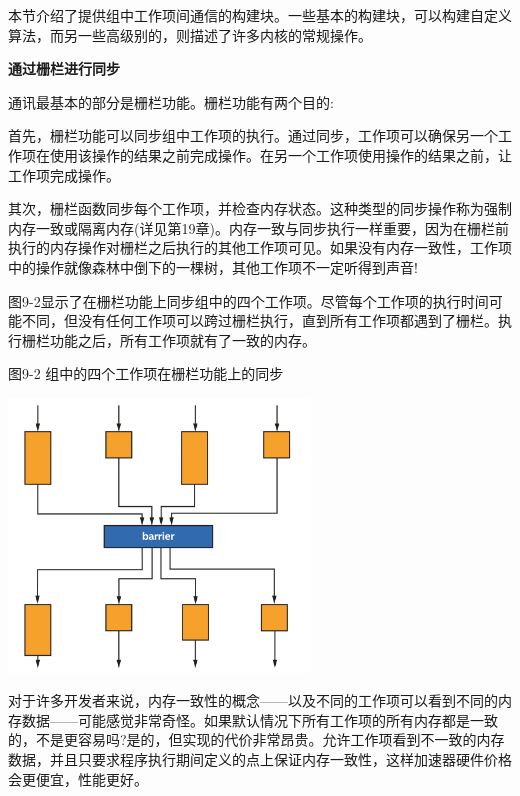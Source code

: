本节介绍了提供组中工作项间通信的构建块。一些基本的构建块，可以构建自定义算法，而另一些高级别的，则描述了许多内核的常规操作。\par

\hspace*{\fill} \par %
\textbf{通过栅栏进行同步}

通讯最基本的部分是栅栏功能。栅栏功能有两个目的:\par

首先，栅栏功能可以同步组中工作项的执行。通过同步，工作项可以确保另一个工作项在使用该操作的结果之前完成操作。在另一个工作项使用操作的结果之前，让工作项完成操作。\par

其次，栅栏函数同步每个工作项，并检查内存状态。这种类型的同步操作称为强制内存一致或隔离内存(详见第19章)。内存一致与同步执行一样重要，因为在栅栏前执行的内存操作对栅栏之后执行的其他工作项可见。如果没有内存一致性，工作项中的操作就像森林中倒下的一棵树，其他工作项不一定听得到声音!\par

图9-2显示了在栅栏功能上同步组中的四个工作项。尽管每个工作项的执行时间可能不同，但没有任何工作项可以跨过栅栏执行，直到所有工作项都遇到了栅栏。执行栅栏功能之后，所有工作项就有了一致的内存。\par

\hspace*{\fill} \par %
图9-2 组中的四个工作项在栅栏功能上的同步
\begin{center}
	\includegraphics[width=0.6\textwidth]{content/chapter-9/images/3}
\end{center}

\begin{tcolorbox}[colback=blue!5!white,colframe=blue!75!black, title=为什么内存在默认情况下不一致?]
对于许多开发者来说，内存一致性的概念——以及不同的工作项可以看到不同的内存数据——可能感觉非常奇怪。如果默认情况下所有工作项的所有内存都是一致的，不是更容易吗?是的，但实现的代价非常昂贵。允许工作项看到不一致的内存数据，并且只要求程序执行期间定义的点上保证内存一致性，这样加速器硬件价格会更便宜，性能更好。
\end{tcolorbox}

